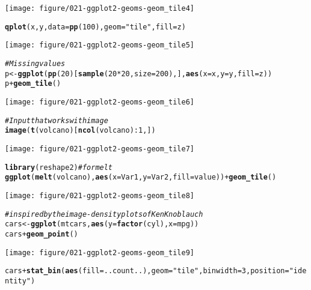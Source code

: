 \documentclass[a4paper,titlepage]{tufte-handout}\usepackage[]{graphicx}\usepackage[]{color}
\makeatletter
\def\maxwidth{ %
  \ifdim\Gin@nat@width>\linewidth
    \linewidth
  \else
    \Gin@nat@width
  \fi
}
\newcommand{\hlnum}[1]{\textcolor[rgb]{0.686,0.059,0.569}{#1}}%
\newcommand{\hlstr}[1]{\textcolor[rgb]{0.192,0.494,0.8}{#1}}%
\newcommand{\hlcom}[1]{\textcolor[rgb]{0.678,0.584,0.686}{\textit{#1}}}%
\newcommand{\hlopt}[1]{\textcolor[rgb]{0,0,0}{#1}}%
\newcommand{\hlstd}[1]{\textcolor[rgb]{0.345,0.345,0.345}{#1}}%
\newcommand{\hlkwb}[1]{\textcolor[rgb]{0.69,0.353,0.396}{#1}}%
\newcommand{\hlkwc}[1]{\textcolor[rgb]{0.333,0.667,0.333}{#1}}%
\newcommand{\hlkwd}[1]{\textcolor[rgb]{0.737,0.353,0.396}{\textbf{#1}}}%
\newenvironment{kframe}{%
 \def\at@end@of@kframe{}%
 \ifinner\ifhmode%
  \def\at@end@of@kframe{\end{minipage}}%
  \begin{minipage}{\columnwidth}%
 \fi\fi%
 \def\FrameCommand##1{\hskip\@totalleftmargin \hskip-\fboxsep
 \colorbox{shadecolor}{##1}\hskip-\fboxsep
     \hskip-\linewidth \hskip-\@totalleftmargin \hskip\columnwidth}%
 \MakeFramed {\advance\hsize-\width
   \@totalleftmargin\z@ \linewidth\hsize
   \@setminipage}}%
 {\par\unskip\endMakeFramed%
 \at@end@of@kframe}
\newenvironment{knitrout}{}{} %
\makeatother
\begin{document}
\begin{knitrout}
\begin{kframe}
\begin{alltt}
\end{alltt}
\end{kframe}
\texttt{[image: figure/021-ggplot2-geoms-geom\_tile4]} 
\begin{kframe}\begin{alltt}
\hlkwd{qplot}\hlstd{(x, y,} \hlkwc{data}\hlstd{=}\hlkwd{pp}\hlstd{(}\hlnum{100}\hlstd{),} \hlkwc{geom}\hlstd{=}\hlstr{"tile"}\hlstd{,} \hlkwc{fill}\hlstd{=z)}
\end{alltt}
\end{kframe}
\texttt{[image: figure/021-ggplot2-geoms-geom\_tile5]} 
\begin{kframe}\begin{alltt}
\hlcom{# Missing values}
\hlstd{p} \hlkwb{<-} \hlkwd{ggplot}\hlstd{(}\hlkwd{pp}\hlstd{(}\hlnum{20}\hlstd{)[}\hlkwd{sample}\hlstd{(}\hlnum{20}\hlopt{*}\hlnum{20}\hlstd{,} \hlkwc{size}\hlstd{=}\hlnum{200}\hlstd{),],} \hlkwd{aes}\hlstd{(}\hlkwc{x}\hlstd{=x,}\hlkwc{y}\hlstd{=y,}\hlkwc{fill}\hlstd{=z))}
\hlstd{p} \hlopt{+} \hlkwd{geom_tile}\hlstd{()}
\end{alltt}
\end{kframe}
\texttt{[image: figure/021-ggplot2-geoms-geom\_tile6]} 
\begin{kframe}\begin{alltt}
\hlcom{# Input that works with image}
\hlkwd{image}\hlstd{(}\hlkwd{t}\hlstd{(volcano)[}\hlkwd{ncol}\hlstd{(volcano)}\hlopt{:}\hlnum{1}\hlstd{,])}
\end{alltt}
\end{kframe}
\texttt{[image: figure/021-ggplot2-geoms-geom\_tile7]} 
\begin{kframe}\begin{alltt}
\hlkwd{library}\hlstd{(reshape2)} \hlcom{# for melt}
\hlkwd{ggplot}\hlstd{(}\hlkwd{melt}\hlstd{(volcano),} \hlkwd{aes}\hlstd{(}\hlkwc{x}\hlstd{=Var1,} \hlkwc{y}\hlstd{=Var2,} \hlkwc{fill}\hlstd{=value))} \hlopt{+} \hlkwd{geom_tile}\hlstd{()}
\end{alltt}
\end{kframe}
\texttt{[image: figure/021-ggplot2-geoms-geom\_tile8]} 
\begin{kframe}\begin{alltt}
\hlcom{# inspired by the image-density plots of Ken Knoblauch}
\hlstd{cars} \hlkwb{<-} \hlkwd{ggplot}\hlstd{(mtcars,} \hlkwd{aes}\hlstd{(}\hlkwc{y}\hlstd{=}\hlkwd{factor}\hlstd{(cyl),} \hlkwc{x}\hlstd{=mpg))}
\hlstd{cars} \hlopt{+} \hlkwd{geom_point}\hlstd{()}
\end{alltt}
\end{kframe}
\texttt{[image: figure/021-ggplot2-geoms-geom\_tile9]} 
\begin{kframe}\begin{alltt}
\hlstd{cars} \hlopt{+} \hlkwd{stat_bin}\hlstd{(}\hlkwd{aes}\hlstd{(}\hlkwc{fill}\hlstd{=..count..),} \hlkwc{geom}\hlstd{=}\hlstr{"tile"}\hlstd{,} \hlkwc{binwidth}\hlstd{=}\hlnum{3}\hlstd{,} \hlkwc{position}\hlstd{=}\hlstr{"identity"}\hlstd{)}
\end{alltt}



\end{kframe}
\end{knitrout}
\end{document}
